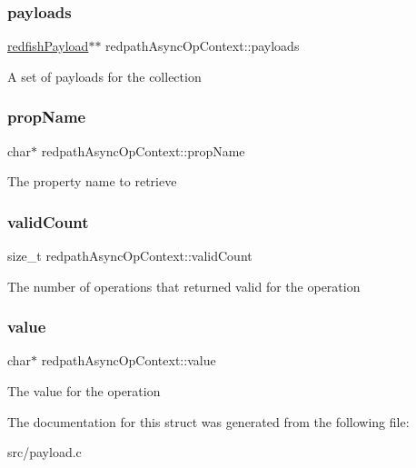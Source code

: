 \subsubsection{\texorpdfstring{payloads}{payloads}}
{\footnotesize\ttfamily \hyperlink{structredfishPayload}{redfish\+Payload}$\ast$$\ast$ redpath\+Async\+Op\+Context\+::payloads}

A set of payloads for the collection \mbox{\label{structredpathAsyncOpContext_a9a46d450cf13ff95148457623f7c9d87}} 
\subsubsection{\texorpdfstring{prop\+Name}{propName}}
{\footnotesize\ttfamily char$\ast$ redpath\+Async\+Op\+Context\+::prop\+Name}

The property name to retrieve \mbox{\label{structredpathAsyncOpContext_a823ad5ca475b0f36527b6502e5b1f1a9}} 
\subsubsection{\texorpdfstring{valid\+Count}{validCount}}
{\footnotesize\ttfamily size\+\_\+t redpath\+Async\+Op\+Context\+::valid\+Count}

The number of operations that returned valid for the operation \mbox{\label{structredpathAsyncOpContext_a99896f99b5911f8d699c4212bdd651aa}} 
\subsubsection{\texorpdfstring{value}{value}}
{\footnotesize\ttfamily char$\ast$ redpath\+Async\+Op\+Context\+::value}

The value for the operation 

The documentation for this struct was generated from the following file\+:\begin{DoxyCompactItemize}
\item 
src/payload.\+c\end{DoxyCompactItemize}
